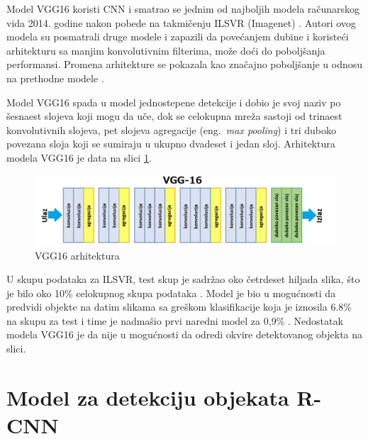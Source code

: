 \documentclass[12pt,oneside]{memoir}
\begin{document}
Model VGG16 koristi CNN i smatrao se jednim od najboljih modela računarskog vida 2014. godine nakon pobede na takmičenju ILSVR (Imagenet) \cite{simonyan2014very}. Autori ovog modela su posmatrali druge modele i zapazili da povećanjem dubine i koristeći arhitekturu sa manjim konvolutivnim filterima, može doći do poboljšanja performansi. Promena arhitekture se pokazala kao značajno poboljšanje u odnosu na prethodne modele \cite{simonyan2014very}. 

Model VGG16 spada u model jednostepene detekcije i dobio je svoj naziv po šesnaest slojeva koji mogu da uče, dok se celokupna mreža sastoji od trinaest konvolutivnih slojeva, pet slojeva agregacije (eng.~\textit{max pooling}) i tri duboko povezana sloja koji se sumiraju u ukupno dvadeset i jedan sloj. Arhitektura modela VGG16 je data na slici \ref{fig:section2_vgg16}.

\begin{figure}[ht]
    \centering
    \includegraphics[width=1\textwidth]{matfmaster/glava2/vgg16_2.png}
    \caption{VGG16 arhitektura}
    \label{fig:section2_vgg16}
\end{figure}

U skupu podataka za ILSVR, test skup je sadržao oko četrdeset hiljada slika, što je bilo oko 10\% celokupnog skupa podataka \cite{LSVRC2013}.  Model je bio u mogućnosti da predvidi objekte na datim slikama sa greškom klasifikacije koja je iznosila 6.8\% na skupu za test i time je nadmašio prvi naredni model za 0,9\% \cite{simonyan2014very}.
Nedostatak modela VGG16 je da nije u mogućnosti da odredi okvire detektovanog objekta na slici.



\section{Model za detekciju objekata R-CNN}
\end{document}

